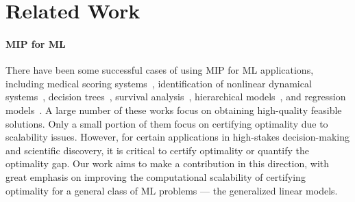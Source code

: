 \section{Related Work}
\label{sec:related_work}

\paragraph{MIP for ML}
There have been some successful cases of using MIP for ML applications, including
medical scoring systems~\cite{ustun2016supersparse, ustun2019learning, liu2022fasterrisk}, 
identification of nonlinear dynamical systems~\cite{bertsimas2023learning, liu2024okridge},
decision trees~\cite{bertsimas2017optimal, hu2019optimal},
survival analysis~\cite{zhang2023optimal, liu2024fastsurvival},
hierarchical models~\cite{bertsimas2020sparse, shafiee2024constrained},
and regression models~\cite{xie2020scalable, bertsimas2020sparse1, bertsimas2020sparse2, hazimeh2020fast, atamturk2020safe, hazimeh2022sparse, liu2024okridge, guyard2024el0ps}.
A large number of these works focus on obtaining high-quality feasible solutions.
Only a small portion of them focus on certifying optimality due to scalability issues.
However, for certain applications in high-stakes decision-making and scientific discovery, it is critical to certify optimality or quantify the optimality gap.
Our work aims to make a contribution in this direction, with great emphasis on improving the computational scalability of certifying optimality for a general class of ML problems --- the generalized linear models.

